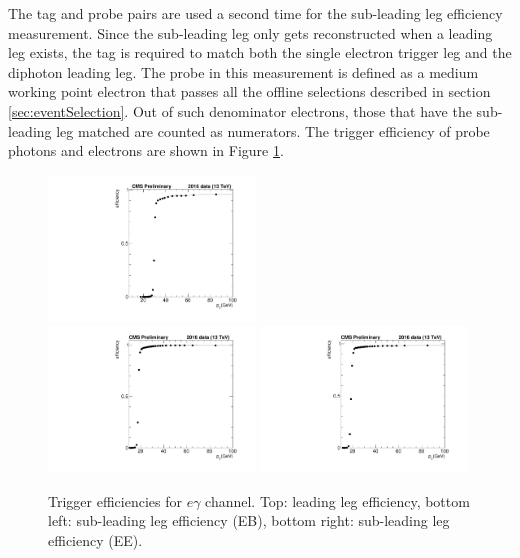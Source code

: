 \documentclass[thesis.tex]{subfiles}
\renewcommand\_{\textunderscore\allowbreak}
\begin{document}
The tag and probe pairs are used a second time for the sub-leading leg efficiency measurement. 
Since the sub-leading leg only gets reconstructed when a leading leg exists, the tag is required to match both the single electron trigger leg and the diphoton leading leg. 
The probe in this measurement is defined as a medium working point electron that passes all the offline selections described in section \ref{sec:eventSelection}. 
Out of such denominator electrons, those that have the sub-leading leg matched are counted as numerators. 
The trigger efficiency of probe photons and electrons are shown in Figure \ref{fig:egtriggereff}.

\begin{figure}[tb]
  \centering
    \includegraphics[width=0.49\textwidth]{Figures/egTrigger_2016_leading.pdf}\\
    \includegraphics[width=0.49\textwidth]{Figures/egTrigger_2016_trailingEB.pdf}
    \includegraphics[width=0.49\textwidth]{Figures/egTrigger_2016_trailingEE.pdf}
  \caption{Trigger efficiencies for $e\gamma$ channel. Top: leading leg efficiency, bottom left: sub-leading leg efficiency (EB), bottom right: sub-leading leg efficiency (EE).}
  \label{fig:egtriggereff}
\end{figure}
\end{document}

